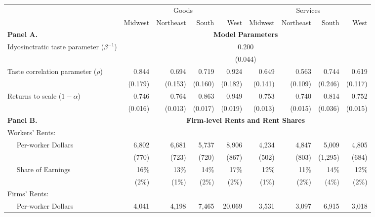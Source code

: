 \begin{tabular}{lrrrrrrrr}
\toprule 
\midrule 
 & \multicolumn{4}{c}{Goods} & \multicolumn{4}{c}{Services} \\
 \cmidrule(lr){2-5} \cmidrule(lr){6-9} 
 & Midwest & Northeast & South & West & Midwest & Northeast & South & West \\[5pt]
\midrule 
\textbf{Panel A.} & \multicolumn{8}{c}{\textbf{Model Parameters}} \\
 \cmidrule(lr){2-9} 
Idyosinctratic taste parameter ($\beta^{-1}$) & \multicolumn{8}{c}{0.200} \\
  & \multicolumn{8}{c}{{(\footnotesize 0.044)}} \\[5pt]
Taste correlation parameter ($\rho$) & 0.844 & 0.694 & 0.719 & 0.924 & 0.649 & 0.563 & 0.744 & 0.619 \\
  & {(\footnotesize 0.179)} & {(\footnotesize 0.153)} & {(\footnotesize 0.160)} & {(\footnotesize 0.182)} & {(\footnotesize 0.141)} & {(\footnotesize 0.109)} & {(\footnotesize 0.246)} & {(\footnotesize 0.117)} \\[5pt]
Returns to scale ($1-\alpha$) & 0.746 & 0.764 & 0.863 & 0.949 & 0.753 & 0.740 & 0.814 & 0.752 \\
  & {(\footnotesize 0.016)} & {(\footnotesize 0.013)} & {(\footnotesize 0.017)} & {(\footnotesize 0.019)} & {(\footnotesize 0.013)} & {(\footnotesize 0.015)} & {(\footnotesize 0.036)} & {(\footnotesize 0.015)} \\[5pt]
\midrule 
\textbf{Panel B.} & \multicolumn{8}{c}{\textbf{Firm-level Rents and Rent Shares}} \\
 \cmidrule(lr){2-9} 
Workers' Rents: \\
$\quad$ Per-worker Dollars & 6,802 & 6,681 & 5,737 & 8,906 & 4,234 & 4,847 & 5,009 & 4,805 \\
  & {(\footnotesize 770)} & {(\footnotesize 723)} & {(\footnotesize 720)} & {(\footnotesize 867)} & {(\footnotesize 502)} & {(\footnotesize 803)} & {(\footnotesize 1,295)} & {(\footnotesize 684)} \\[5pt]
$\quad$ Share of Earnings & 16\% & 13\% & 14\% & 17\% & 12\% & 11\% & 14\% & 12\% \\
  & {(\footnotesize 2\%)} & {(\footnotesize 1\%)} & {(\footnotesize 2\%)} & {(\footnotesize 2\%)} & {(\footnotesize 1\%)} & {(\footnotesize 2\%)} & {(\footnotesize 4\%)} & {(\footnotesize 2\%)} \\[5pt]
Firms' Rents: \\
$\quad$ Per-worker Dollars & 4,041 & 4,198 & 7,465 & 20,069 & 3,531 & 3,097 & 6,915 & 3,018 \\

\end{tabular}
